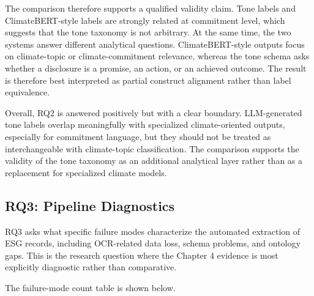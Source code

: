 The comparison therefore supports a qualified validity claim. Tone labels and ClimateBERT-style labels are strongly related at commitment level, which suggests that the tone taxonomy is not arbitrary. At the same time, the two systems answer different analytical questions. ClimateBERT-style outputs focus on climate-topic or climate-commitment relevance, whereas the tone schema asks whether a disclosure is a promise, an action, or an achieved outcome. The result is therefore best interpreted as partial construct alignment rather than label equivalence.

Overall, RQ2 is answered positively but with a clear boundary. LLM-generated tone labels overlap meaningfully with specialized climate-oriented outputs, especially for commitment language, but they should not be treated as interchangeable with climate-topic classification. The comparison supports the validity of the tone taxonomy as an additional analytical layer rather than as a replacement for specialized climate models.

\subsection{RQ3: Pipeline Diagnostics}

RQ3 asks what specific failure modes characterize the automated extraction of ESG records, including OCR-related data loss, schema problems, and ontology gaps. This is the research question where the Chapter 4 evidence is most explicitly diagnostic rather than comparative.

The failure-mode count table is shown below.

